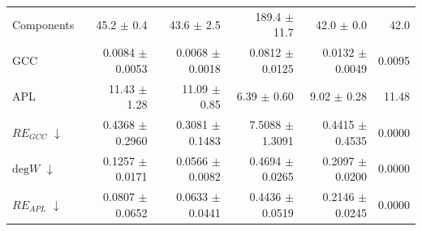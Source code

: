 \begin{table}[H]
\begin{tabular}{lrrrrr}
Components                    & 45.2 $\pm$ 0.4 & 43.6 $\pm$ 2.5 & 189.4 $\pm$ 11.7 & 42.0 $\pm$ 0.0 & 42.0 \\
GCC                           & 0.0084 $\pm$ 0.0053 & 0.0068 $\pm$ 0.0018 & 0.0812 $\pm$ 0.0125 & 0.0132 $\pm$ 0.0049 & 0.0095 \\
APL                           & 11.43 $\pm$ 1.28 & 11.09 $\pm$ 0.85 & 6.39 $\pm$ 0.60 & 9.02 $\pm$ 0.28 & 11.48 \\
\midrule
$RE_{GCC}$ $\downarrow$       & 0.4368 $\pm$ 0.2960 & 0.3081 $\pm$ 0.1483 & 7.5088 $\pm$ 1.3091 & 0.4415 $\pm$ 0.4535 & 0.0000 \\
$\mathrm{deg}W$ $\downarrow$  & 0.1257 $\pm$ 0.0171 & 0.0566 $\pm$ 0.0082 & 0.4694 $\pm$ 0.0265 & 0.2097 $\pm$ 0.0200 & 0.0000 \\
$RE_{APL}$ $\downarrow$       & 0.0807 $\pm$ 0.0652 & 0.0633 $\pm$ 0.0441 & 0.4436 $\pm$ 0.0519 & 0.2146 $\pm$ 0.0245 & 0.0000 \\
\bottomrule
\end{tabular}
\end{table}
